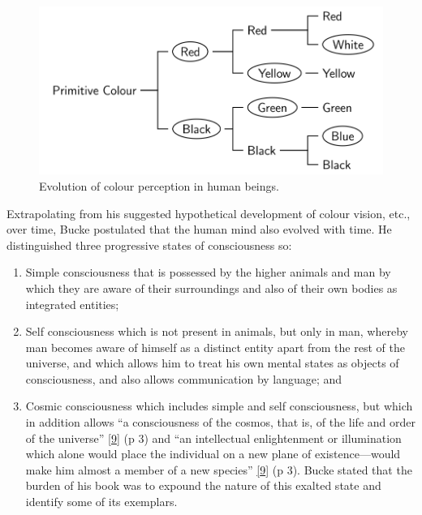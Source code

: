 \documentclass[
  a4paper,
]{article}
\begin{document}
\begin{figure}
\hypertarget{fig:colour-tree}{%
\centering
\includegraphics[width=1\textwidth,height=\textheight]{images/colour-perception-tree.svg}
\caption[Evolution of colour perception in human beings.]{Evolution of
colour perception in human
beings.\footnotemark{}}\label{fig:colour-tree}
}
\end{figure}

Extrapolating from his suggested hypothetical development of colour
vision, etc., over time, Bucke postulated that the human mind also
evolved with time. He distinguished three progressive states of
consciousness so:

\begin{enumerate}
\item
  Simple consciousness that is possessed by the higher animals and man
  by which they are aware of their surroundings and also of their own
  bodies as integrated entities;
\item
  Self consciousness which is not present in animals, but only in man,
  whereby man becomes aware of himself as a distinct entity apart from
  the rest of the universe, and which allows him to treat his own mental
  states as objects of consciousness, and also allows communication by
  language; and
\item
  Cosmic consciousness which includes simple and self consciousness, but
  which in addition allows ``a consciousness of the cosmos, that is, of
  the life and order of the universe''
  \protect\hyperlink{ref-bucke48}{{[}9{]}} (p 3) and ``an intellectual
  enlightenment or illumination which alone would place the individual
  on a new plane of existence---would make him almost a member of a new
  species'' \protect\hyperlink{ref-bucke48}{{[}9{]}} (p 3). Bucke stated
  that the burden of his book was to expound the nature of this exalted
  state and identify some of its exemplars.
\end{enumerate}
\end{document}
